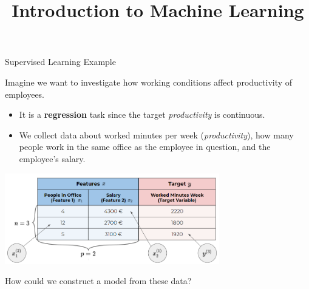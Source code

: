 \documentclass[11pt,compress,t,notes=noshow, xcolor=table]{beamer}
\title{Introduction to Machine Learning}
\begin{document}



\begin{vbframe}{Supervised Learning Example}

Imagine we want to investigate how working conditions affect productivity of employees.

\begin{itemize}
	\item It is a \textbf{regression} task since the target \emph{productivity} is continuous.
	\item We collect data about worked minutes 
per week (\emph{productivity}), how many people work in the same office as the 
employee in question, and the employee's salary.
\end{itemize}
  
\begin{center}
  \includegraphics[width = 0.7\textwidth]{figure_man/data_table} 
\end{center}

\framebreak

How could we construct a model from these data?\\[1ex]


\end{vbframe}
\end{document}
